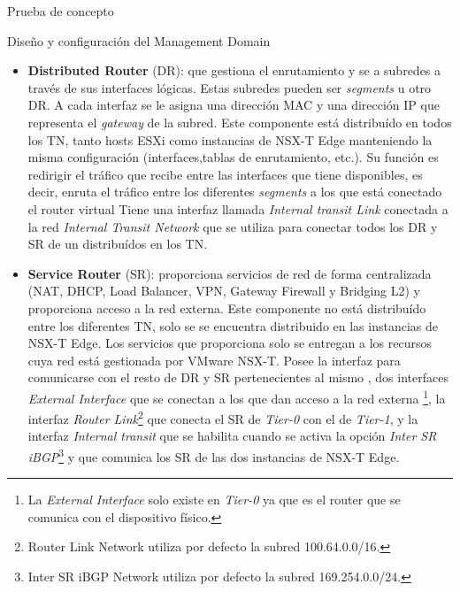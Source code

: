 \begin{section}{Prueba de concepto}
\begin{subsection}{Diseño y configuración del Management Domain}
\begin{itemize}
      \item \textbf{Distributed Router} (DR): que gestiona el enrutamiento y se a subredes a través de sus interfaces lógicas. Estas subredes pueden ser \textit{segments} u otro DR. A cada interfaz se le asigna una dirección MAC y una dirección IP que representa el \textit{gateway} de la subred. Este componente está distribuído en todos los TN, tanto hosts ESXi como instancias de NSX-T Edge manteniendo la misma configuración (interfaces,tablas de enrutamiento, etc.). Su función es redirigir el tráfico que recibe entre las interfaces que tiene disponibles, es decir, enruta el tráfico entre los diferentes \textit{segments} a los que está conectado el router virtual Tiene una interfaz llamada \textit{Internal transit Link} conectada a la red \textit{Internal Transit Network} que se utiliza para conectar todos los DR y SR de un  distribuídos en los TN.
      
      \item \textbf{Service Router} (SR): proporciona servicios de red de forma centralizada (NAT, DHCP, Load Balancer, VPN, Gateway Firewall y Bridging L2) y proporciona acceso a la red externa. Este componente no está distribuído entre los diferentes TN, solo se se encuentra distribuido en las instancias de NSX-T Edge. Los servicios que proporciona solo se entregan a los recursos cuya red está gestionada por VMware NSX-T. Posee la interfaz  para comunicarse con el resto de DR y SR pertenecientes al mismo , dos interfaces \textit{External Interface} que se conectan a los  que dan acceso a la red externa \footnote{La \textit{External Interface} solo existe en \textit{Tier-0} ya que es el router que se comunica con el dispositivo físico.}, la interfaz \textit{Router Link}\footnote{Router Link Network utiliza por defecto la subred 100.64.0.0/16.} que conecta el SR de \textit{Tier-0} con el de \textit{Tier-1}, y la interfaz \textit{Internal transit} que se habilita cuando se activa la opción \textit{Inter SR iBGP}\footnote{Inter SR iBGP Network utiliza por defecto la subred 169.254.0.0/24.} y que comunica los SR de las dos instancias de NSX-T Edge.
    \end{itemize}


\end{subsection}
\end{section}
